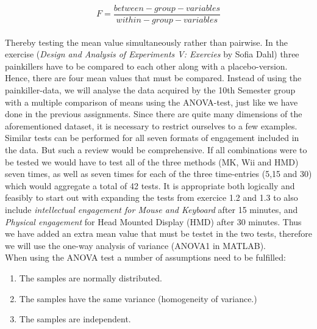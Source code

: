\[F=\frac{between-group-variables}{within-group-variables}\]
\\
Thereby testing the mean value simultaneously rather than pairwise.
In the exercise (\textit{Design and Analysis of Experiments V: Exercies} by Sofia Dahl) three painkillers have to be compared to each other along with a placebo-version. Hence, there are four mean values that must be compared.  Instead of using the painkiller-data, we will analyse the data acquired by the 10th Semester group with a multiple comparison of means using the ANOVA-test, just like we have done in the previous assignments.
Since there are quite many dimensions of the aforementioned dataset, it is necessary to restrict ourselves to a few examples. Similar tests can be performed for all seven formats of engagement included in the data. But such a review would be comprehensive. If all combinations were to be tested we would have to test all of the three methods (MK, Wii and HMD) seven times, as well as seven times for each of the three time-entries (5,15 and 30) which would aggregate a total of 42 tests.
It is appropriate both logically and feasibly to start out with expanding the tests from exercice 1.2 and 1.3 to also include \textit{intellectual engagement for Mouse and Keyboard} after 15 minutes, and \textit{Physical engagement} for Head Mounted Display (HMD) after 30 minutes. Thus we have added an extra mean value that must be testet in the two tests, therefore we will use the one-way analysis of variance (ANOVA1 in MATLAB).\\

When using the ANOVA test a number of assumptions need to be fulfilled:
\begin{enumerate}
\item{The samples are normally distributed.}
\item{The samples have the same variance (homogeneity of variance.)}
\item{The samples are independent.}
\end{enumerate}

